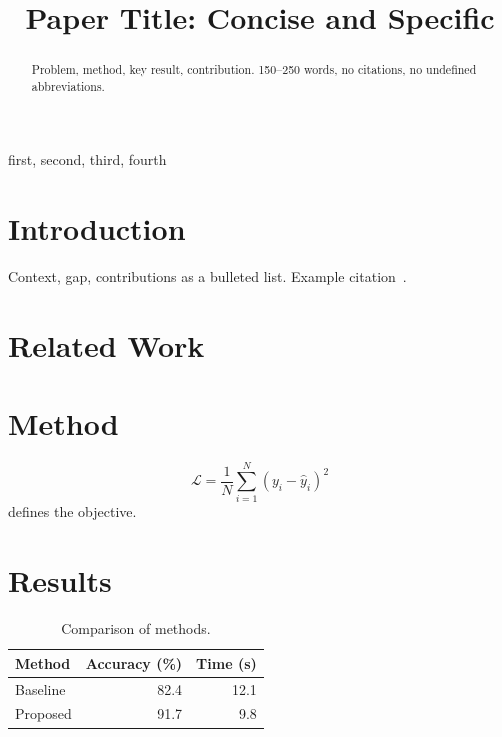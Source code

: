 \documentclass[conference]{IEEEtran}
\begin{document}
\title{Paper Title: Concise and Specific}

\author{
\and
{}
}

\maketitle

\begin{abstract}
Problem, method, key result, contribution. 150--250 words, no citations,
no undefined abbreviations.
\end{abstract}

\begin{IEEEkeywords}
first, second, third, fourth
\end{IEEEkeywords}

\section{Introduction}
\label{sec:intro}
Context, gap, contributions as a bulleted list. Example citation~\cite{smith2023}.

\section{Related Work}
\label{sec:related}

\section{Method}
\label{sec:method}
\begin{equation}
  \label{eq:loss}
  \mathcal{L} = \frac{1}{N}\sum_{i=1}^{N}\left(y_i - \hat{y}_i\right)^2
\end{equation}
 defines the objective.

\section{Results}
\label{sec:results}

\begin{table}[htbp]
  \centering
  \caption{Comparison of methods.}
  \label{tab:results}
  \begin{tabular}{lrr}
    \toprule
    Method & Accuracy (\%) & Time (s) \\
    \midrule
    Baseline & 82.4 & 12.1 \\
    Proposed & 91.7 & 9.8 \\
    \bottomrule
  \end{tabular}
\end{table}
\end{document}
